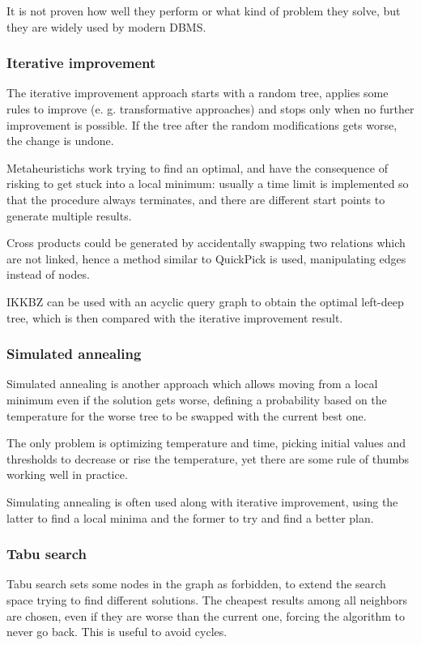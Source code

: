 It is not proven how well they perform or what kind of problem they solve, but they are widely used by modern DBMS.

\subsubsection{Iterative improvement}
The iterative improvement approach starts with a random tree, applies some rules to improve (e. g. transformative approaches) and stops only when no further improvement is possible. If the tree after the random modifications gets worse, the change is undone. 

Metaheuristichs work trying to find an optimal, and have the consequence of risking to get stuck into a local minimum: usually a time limit is implemented so that the procedure always terminates, and there are different start points to generate multiple results.

Cross products could be generated by accidentally swapping two relations which are not linked, hence a method similar to QuickPick is used, manipulating edges instead of nodes.

IKKBZ can be used with an acyclic query graph to obtain the optimal left-deep tree, which is then compared with the iterative improvement result.

\subsubsection{Simulated annealing}
Simulated annealing is another approach which allows moving from a local minimum even if the solution gets worse, defining a probability based on the temperature for the worse tree to be swapped with the current best one. 

The only problem is optimizing temperature and time, picking initial values and thresholds to decrease or rise the temperature, yet there are some rule of thumbs working well in practice.

Simulating annealing is often used along with iterative improvement, using the latter to find a local minima and the former to try and find a better plan.

\subsubsection{Tabu search}
Tabu search sets some nodes in the graph as forbidden, to extend the search space trying to find different solutions. The cheapest results among all neighbors are chosen, even if they are worse than the current one, forcing the algorithm to never go back. This is useful to avoid cycles.  

